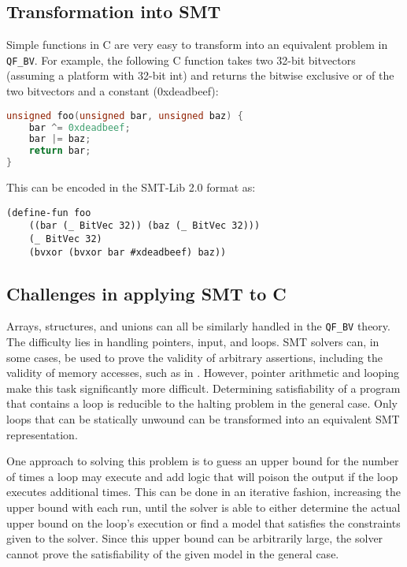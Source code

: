 \documentclass{sig-alternate}
\begin{document}
\subsection{Transformation into SMT}

Simple functions in C are very easy to transform into an equivalent
problem in \texttt{QF\_BV}.  For example, the following C function
takes two 32-bit bitvectors (assuming a platform with 32-bit int) and
returns the bitwise exclusive or of the two bitvectors and a constant
(0xdeadbeef):

\begin{lstlisting}[language=C]
unsigned foo(unsigned bar, unsigned baz) {
    bar ^= 0xdeadbeef;
    bar |= baz;
    return bar;
}
\end{lstlisting}

This can be encoded in the SMT-Lib 2.0 format as:

\begin{lstlisting}
(define-fun foo
    ((bar (_ BitVec 32)) (baz (_ BitVec 32)))
    (_ BitVec 32)
    (bvxor (bvxor bar #xdeadbeef) baz))
\end{lstlisting}

\subsection{Challenges in applying SMT to C}
Arrays, structures, and unions can all be similarly handled in the
\texttt{QF\_BV} theory.  The difficulty lies in handling pointers,
input, and loops.  SMT solvers can, in some cases, be used to prove
the validity of arbitrary assertions, including the validity of
memory accesses, such as in \cite{Gries07}.  However, pointer
arithmetic and looping make this task significantly more difficult.
Determining satisfiability of a program that contains a loop is
reducible to the halting problem in the general case.  Only loops
that can be statically unwound can be transformed into an
equivalent SMT representation.

One approach to solving this problem is to guess an upper bound for
the number of times a loop may execute and add logic that will poison
the output if the loop executes additional times.  This can be done
in an iterative fashion, increasing the upper bound with each run,
until the solver is able to either determine the actual upper bound
on the loop's execution or find a model that satisfies the constraints
given to the solver.  Since this upper bound can be arbitrarily large,
the solver cannot prove the satisfiability of the given model in the
general case.
\end{document}
